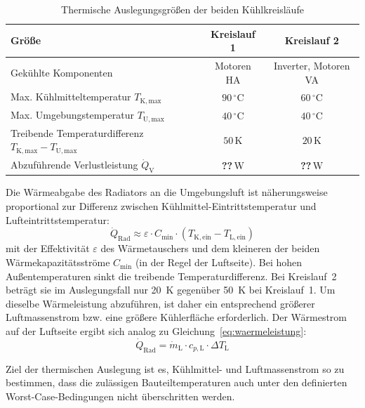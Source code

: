 \begin{table}[htb]
  \centering
  \caption{Thermische Auslegungsgrößen der beiden Kühlkreisläufe}
  \label{tab:thermische_anforderungen}
  \begin{tabular}{|l|c|c|}
    \hline
    Größe & Kreislauf 1 & Kreislauf 2 \\
    \hline
    Gekühlte Komponenten & Motoren HA & Inverter, Motoren VA \\
    \hline
    Max. Kühlmitteltemperatur $T_\mathrm{K,max}$ & $90\,^{\circ}\mathrm{C}$ & $60\,^{\circ}\mathrm{C}$ \\
    \hline
    Max. Umgebungstemperatur $T_\mathrm{U,max}$ & $40\,^{\circ}\mathrm{C}$ & $40\,^{\circ}\mathrm{C}$ \\
    \hline
    Treibende Temperaturdifferenz $T_\mathrm{K,max}-T_\mathrm{U,max}$ & $50\,\mathrm{K}$ & $20\,\mathrm{K}$ \\
    \hline
    Abzuführende Verlustleistung $\dot{Q}_\mathrm{V}$ & \textbf{??}\,W & \textbf{??}\,W \\
    \hline
  \end{tabular}
\end{table}

Die Wärmeabgabe des Radiators an die Umgebungsluft ist näherungsweise
proportional zur Differenz zwischen Kühlmittel-Eintrittstemperatur und
Lufteintrittstemperatur:
\begin{equation}
  \dot{Q}_\mathrm{Rad} \approx \varepsilon \cdot C_\mathrm{min} \cdot
  \left(T_\mathrm{K,ein} - T_\mathrm{L,ein}\right)
  \label{eq:radiator}
\end{equation}
mit der Effektivität $\varepsilon$ des Wärmetauschers und dem kleineren der
beiden Wärmekapazitätsströme $C_\mathrm{min}$ (in der Regel der Luftseite). Bei
hohen Außentemperaturen sinkt die treibende Temperaturdifferenz. Bei
Kreislauf~2 beträgt sie im Auslegungsfall nur \SI{20}{\kelvin} gegenüber
\SI{50}{\kelvin} bei Kreislauf~1. Um dieselbe Wärmeleistung abzuführen, ist daher
ein entsprechend größerer Luftmassenstrom bzw. eine größere Kühlerfläche
erforderlich. Der Wärmestrom auf der Luftseite ergibt sich analog zu
Gleichung~\eqref{eq:waermeleistung}:
\begin{equation}
  \dot{Q}_\mathrm{Rad} = \dot{m}_\mathrm{L} \cdot c_{p,\mathrm{L}} \cdot
  \Delta T_\mathrm{L}
  \label{eq:luftseite}
\end{equation}

Ziel der thermischen Auslegung ist es, Kühlmittel- und Luftmassenstrom so zu
bestimmen, dass die zulässigen Bauteiltemperaturen auch unter den definierten
Worst-Case-Bedingungen nicht überschritten werden.

